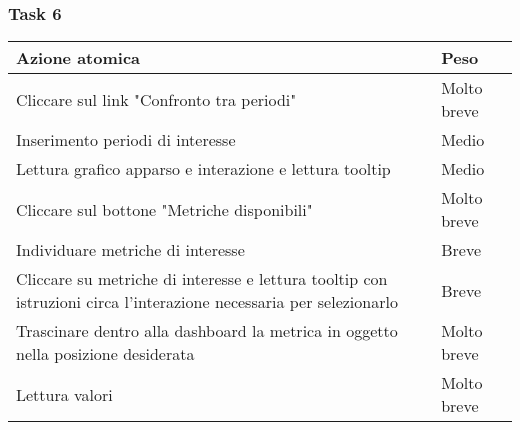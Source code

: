 \subsubsection{Task 6}
\label{sss:iaa-task-6}

{
\renewcommand{\arraystretch}{2}
\begin{longtable}[h]{| p{14cm} | p{2.5cm} |}
    \hline
    \textbf{Azione atomica} & \textbf{Peso} \\
    \hline
    \endhead
    Cliccare sul link "Confronto tra periodi" & Molto breve \\
    \hline
    Inserimento periodi di interesse & Medio  \\
    \hline
    Lettura grafico apparso e interazione e lettura tooltip & Medio \\
    \hline
    Cliccare sul bottone "Metriche disponibili" & Molto breve \\
    \hline
    Individuare metriche di interesse & Breve \\
    \hline
    Cliccare su metriche di interesse e lettura tooltip con istruzioni circa l'interazione necessaria per selezionarlo & Breve \\
    \hline
    Trascinare dentro alla dashboard la metrica in oggetto nella posizione desiderata & Molto breve \\
    \hline
    Lettura valori & Molto breve \\
    \hline
\end{longtable}
}
